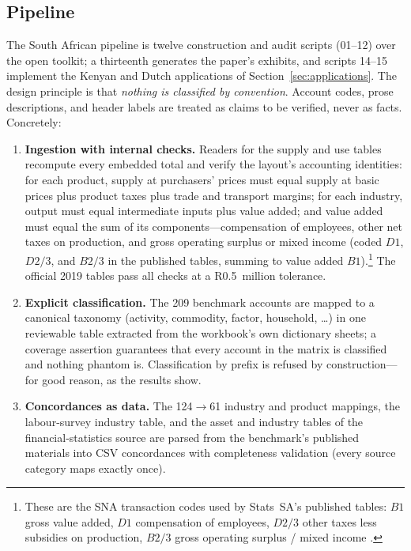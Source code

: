 \subsection{Pipeline}

The South African pipeline is twelve construction and audit scripts
(01--12) over the open toolkit; a thirteenth generates the paper's
exhibits, and scripts 14--15 implement the Kenyan and Dutch applications
of Section~\ref{sec:applications}. The design principle is that
\emph{nothing is classified by convention}. Account codes, prose
descriptions, and header labels are treated as claims to be verified,
never as facts. Concretely:

\begin{enumerate}
  \item \textbf{Ingestion with internal checks.} Readers for the supply and
  use tables recompute every embedded total and verify the layout's
  accounting identities: for each product, supply at purchasers' prices
  must equal supply at basic prices plus product taxes plus trade and
  transport margins; for each industry, output must equal intermediate
  inputs plus value added; and value added must equal the sum of its
  components---compensation of employees, other net taxes on production,
  and gross operating surplus or mixed income (coded $D1$, $D2/3$, and
  $B2/3$ in the published tables, summing to value added
  $B1$).\footnote{These are the SNA transaction codes used by Stats~SA's
  published tables: $B1$ gross value added, $D1$ compensation of
  employees, $D2/3$ other taxes less subsidies on production, $B2/3$ gross
  operating surplus / mixed income \citep{un2009sna}.} The official 2019
  tables pass all checks at a R0.5~million tolerance.
  \item \textbf{Explicit classification.} The 209 benchmark accounts are
  mapped to a canonical taxonomy (activity, commodity, factor, household,
  \ldots) in one reviewable table extracted from the workbook's own
  dictionary sheets; a coverage assertion guarantees that every account in
  the matrix is classified and nothing phantom is. Classification by prefix
  is refused by construction---for good reason, as the results show.
  \item \textbf{Concordances as data.} The 124$\to$61 industry and
  product mappings, the labour-survey industry table, and the asset and
  industry tables of the financial-statistics source are parsed from the
  benchmark's published materials into CSV concordances with completeness
  validation (every source category maps exactly once).

\end{enumerate}
